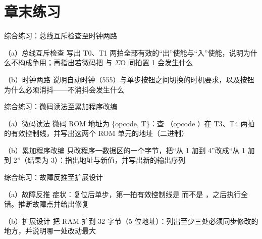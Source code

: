 \section*{章末练习}

\begin{chapterexercise}{综合练习：总线互斥检查至时钟两路}
\begin{exercisesubproblem}{（a）总线互斥检查}
写出 T0、T1 两拍全部有效的“出”使能与“入”使能，说明为什么不构成争用；再指出若微码把  与 $\Sigma$O 同拍置 1 会发生什么
\end{exercisesubproblem}
\begin{exercisesubproblem}{（b）时钟两路}
说明自动时钟（555）与单步按钮之间切换的时机要求，以及按钮为什么必须消抖——不消抖会发生什么
\end{exercisesubproblem}
\end{chapterexercise}

\begin{chapterexercise}{综合练习：微码读法至累加程序改编}
\begin{exercisesubproblem}{（a）微码读法}
微码 ROM 地址为 \{opcode, T\}：查 （opcode ）在 T3、T4 两拍的有效控制线，并写出这两个 ROM 单元的地址（二进制）
\end{exercisesubproblem}
\begin{exercisesubproblem}{（b）累加程序改编}
只改程序一数据区的一个字节，把“从 1 加到 4”改成“从 1 加到 2”（结果为 3）：指出地址与新值，并写出新的输出序列
\end{exercisesubproblem}
\end{chapterexercise}

\begin{chapterexercise}{综合练习：故障反推至扩展设计}
\begin{exercisesubproblem}{（a）故障反推}
症状：复位后单步，第一拍有效控制线是  而不是 ，之后执行全错。推断故障点并给出修复
\end{exercisesubproblem}
\begin{exercisesubproblem}{（b）扩展设计}
把 RAM 扩到 32 字节（5 位地址）：列出至少三处必须同步修改的地方，并说明哪一处改动最大
\end{exercisesubproblem}
\end{chapterexercise}


